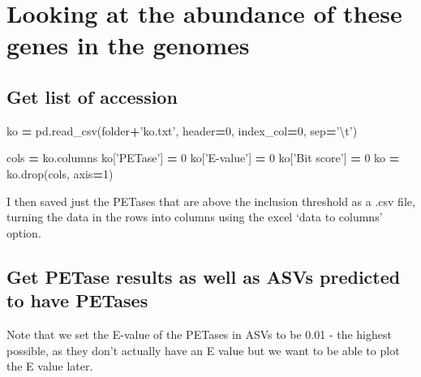 \documentclass[
]{article}
\newenvironment{Shaded}{\begin{snugshade}}{\end{snugshade}}
\newcommand{\CharTok}[1]{\textcolor[rgb]{0.31,0.60,0.02}{#1}}
\newcommand{\DecValTok}[1]{\textcolor[rgb]{0.00,0.00,0.81}{#1}}
\newcommand{\NormalTok}[1]{#1}
\newcommand{\OperatorTok}[1]{\textcolor[rgb]{0.81,0.36,0.00}{\textbf{#1}}}
\newcommand{\StringTok}[1]{\textcolor[rgb]{0.31,0.60,0.02}{#1}}
\begin{document}
\hypertarget{looking-at-the-abundance-of-these-genes-in-the-genomes}{%
\section{Looking at the abundance of these genes in the
genomes}\label{looking-at-the-abundance-of-these-genes-in-the-genomes}}

\hypertarget{get-list-of-accession}{%
\subsection{Get list of accession}\label{get-list-of-accession}}

\begin{Shaded}
\begin{Highlighting}[]
\NormalTok{ko }\OperatorTok{=}\NormalTok{ pd.read_csv(folder}\OperatorTok{+}\StringTok{'ko.txt'}\NormalTok{, header}\OperatorTok{=}\DecValTok{0}\NormalTok{, index_col}\OperatorTok{=}\DecValTok{0}\NormalTok{, sep}\OperatorTok{=}\StringTok{'}\CharTok{\textbackslash{}t}\StringTok{'}\NormalTok{)}
\end{Highlighting}
\end{Shaded}

\begin{Shaded}
\begin{Highlighting}[]
\NormalTok{cols }\OperatorTok{=}\NormalTok{ ko.columns}
\NormalTok{ko[}\StringTok{'PETase'}\NormalTok{] }\OperatorTok{=} \DecValTok{0}
\NormalTok{ko[}\StringTok{'E-value'}\NormalTok{] }\OperatorTok{=} \DecValTok{0}
\NormalTok{ko[}\StringTok{'Bit score'}\NormalTok{] }\OperatorTok{=} \DecValTok{0}
\NormalTok{ko }\OperatorTok{=}\NormalTok{ ko.drop(cols, axis}\OperatorTok{=}\DecValTok{1}\NormalTok{)}
\end{Highlighting}
\end{Shaded}

I then saved just the PETases that are above the inclusion threshold as
a .csv file, turning the data in the rows into columns using the excel
`data to columns' option.

\hypertarget{get-petase-results-as-well-as-asvs-predicted-to-have-petases}{%
\subsection{Get PETase results as well as ASVs predicted to have
PETases}\label{get-petase-results-as-well-as-asvs-predicted-to-have-petases}}

Note that we set the E-value of the PETases in ASVs to be 0.01 - the
highest possible, as they don't actually have an E value but we want to
be able to plot the E value later.
\end{document}
